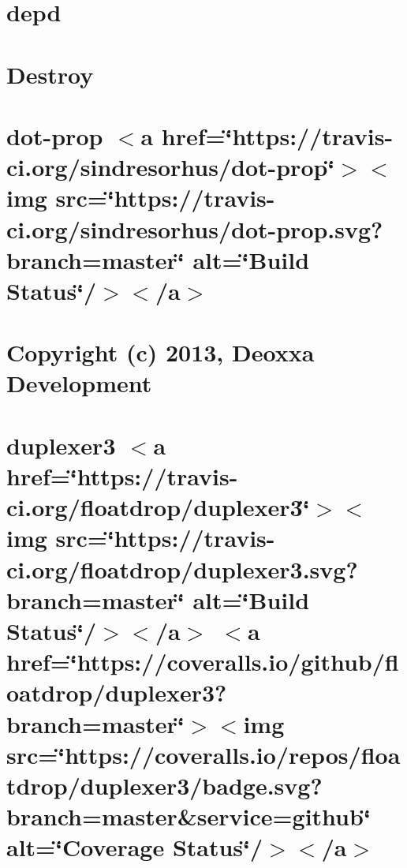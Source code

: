 \let\mypdfximage\pdfximage\def\pdfximage{\immediate\mypdfximage}\documentclass[twoside]{book}
\newcommand{\+}{\discretionary{\mbox{\scriptsize$\hookleftarrow$}}{}{}}
\begin{document}
\chapter{depd}
\label{md__c_1__git_hub__p_r_o_y_e_c_t_o-_i_i_i-_g_o_t_rest-api_node_modules_depd__readme}

\chapter{Destroy}
\label{md__c_1__git_hub__p_r_o_y_e_c_t_o-_i_i_i-_g_o_t_rest-api_node_modules_destroy__r_e_a_d_m_e}

\chapter{dot-\/prop $<$a href=\char`\"{}https\+://travis-\/ci.\+org/sindresorhus/dot-\/prop\char`\"{}$>$$<$img src=\char`\"{}https\+://travis-\/ci.\+org/sindresorhus/dot-\/prop.\+svg?branch=master\char`\"{} alt=\char`\"{}\+Build Status\char`\"{}/$>$$<$/a$>$}
\label{md__c_1__git_hub__p_r_o_y_e_c_t_o-_i_i_i-_g_o_t_rest-api_node_modules_dot-prop_readme}

\chapter{Copyright (c) 2013, Deoxxa Development}
\label{md__c_1__git_hub__p_r_o_y_e_c_t_o-_i_i_i-_g_o_t_rest-api_node_modules_duplexer3__l_i_c_e_n_s_e}

\chapter{duplexer3 $<$a href=\char`\"{}https\+://travis-\/ci.\+org/floatdrop/duplexer3\char`\"{}$>$$<$img src=\char`\"{}https\+://travis-\/ci.\+org/floatdrop/duplexer3.\+svg?branch=master\char`\"{} alt=\char`\"{}\+Build Status\char`\"{}/$>$$<$/a$>$ $<$a href=\char`\"{}https\+://coveralls.\+io/github/floatdrop/duplexer3?branch=master\char`\"{}$>$$<$img src=\char`\"{}https\+://coveralls.\+io/repos/floatdrop/duplexer3/badge.\+svg?branch=master\&service=github\char`\"{} alt=\char`\"{}\+Coverage Status\char`\"{}/$>$$<$/a$>$}
\label{md__c_1__git_hub__p_r_o_y_e_c_t_o-_i_i_i-_g_o_t_rest-api_node_modules_duplexer3__r_e_a_d_m_e}

\end{document}
